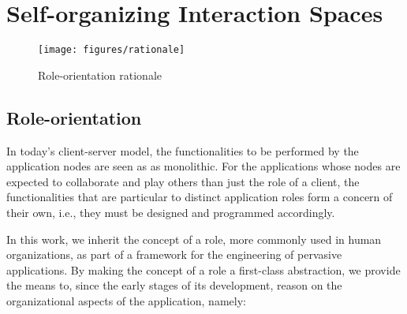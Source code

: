 \section{Self-organizing Interaction Spaces}\label{sec:edge_spaces}

\begin{figure*}[t!]
	\centering
	\texttt{[image: figures/rationale]}
	\caption{Role-orientation rationale}
	\label{fig:rationale}
\end{figure*}


\subsection{Role-orientation}


In today's client-server model, the functionalities to be performed by the application nodes are seen as as monolithic. For the applications whose nodes are expected to collaborate and play others than just the role of a client, the functionalities that are particular to distinct application roles form a concern of their own, i.e., they must be designed and programmed accordingly. 

In this work, we inherit the concept of a role, more commonly used in human organizations, as part of a framework for the engineering of pervasive applications. By making the concept of a role a first-class abstraction, we provide the means to, since the early stages of its development, reason on the organizational aspects of the application, namely:

